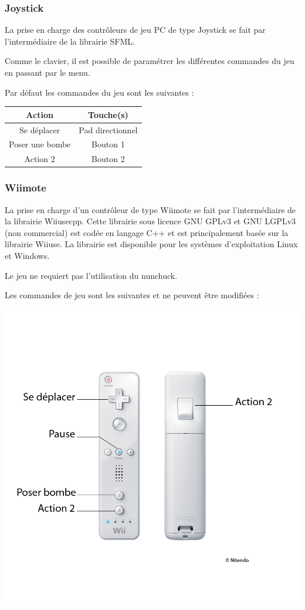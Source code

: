 \subsubsection{Joystick}
La prise en charge des contrôleurs de jeu PC de type Joystick se fait par l'intermédiaire de la librairie SFML.

Comme le clavier, il est possible de paramétrer les différentes commandes du jeu en passant par le menu.

Par défaut les commandes du jeu sont les suivantes :

\begin{center}
	\begin{tabular}{|c|c|}
		\hline
			\rowcolor{blueTab}
			\textbf{Action} & \textbf{Touche(s)} \\
		\hline
		Se déplacer & Pad directionnel \\
		\hline
		Poser une bombe & Bouton 1\\
		\hline
		Action 2 & Bouton 2\\
		\hline
	\end{tabular}
\end{center}


\subsubsection{Wiimote}
La prise en charge d'un contrôleur de type Wiimote se fait par l'intermédiaire de la librairie Wiiusecpp. Cette librairie sous licence GNU GPLv3 et GNU LGPLv3 (non commercial) est codée en langage C++ et est principalement basée sur la librairie Wiiuse. La librairie est disponible pour les systèmes d'exploitation Linux et Windows.

Le jeu ne requiert pas l'utilisation du nunchuck.

Les commandes de jeu sont les suivantes et ne peuvent être modifiées :

\begin{center}
	\includegraphics[scale=1.7]{images/wiimote}
\end{center}